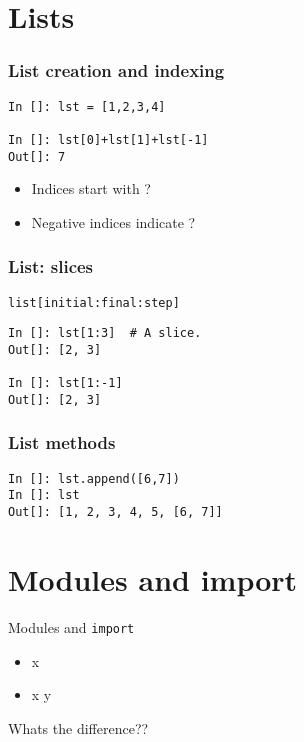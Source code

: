 \documentclass[14pt,compress]{beamer}
\newcounter{time}
\newcommand{\inctime}[1]{\addtocounter{time}{#1}{\tiny \thetime\ m}}
\newcommand{\typ}[1]{\lstinline{#1}}
\newcommand{\kwrd}[1]{ \texttt{\textbf{\color{blue}{#1}}}  }
\begin{document}
\section{Lists}

\begin{frame}[fragile]
  \frametitle{List creation and indexing}
\begin{lstlisting}
In []: lst = [1,2,3,4] 

In []: lst[0]+lst[1]+lst[-1]
Out[]: 7
\end{lstlisting}
\begin{itemize}
  \item Indices start with ?
  \item Negative indices indicate ?
  \end{itemize}
\end{frame}

\begin{frame}[fragile]
  \frametitle{List: slices}
  \typ{list[initial:final:step]}
\begin{lstlisting}
In []: lst[1:3]  # A slice.
Out[]: [2, 3]

In []: lst[1:-1]
Out[]: [2, 3]
\end{lstlisting}
\end{frame}

\begin{frame}[fragile]
  \frametitle{List methods}
\begin{lstlisting}
In []: lst.append([6,7])
In []: lst
Out[]: [1, 2, 3, 4, 5, [6, 7]]
\end{lstlisting}
\inctime{10}
\end{frame}

\section{Modules and import}
\begin{frame}{Modules and \typ{import}}
  \begin{itemize}
    \item \kwrd{import} x
    \item \kwrd{from} x \kwrd{import} y
  \end{itemize}
\pause
Whats the difference??
\inctime{5}
\end{frame}
\end{document}
